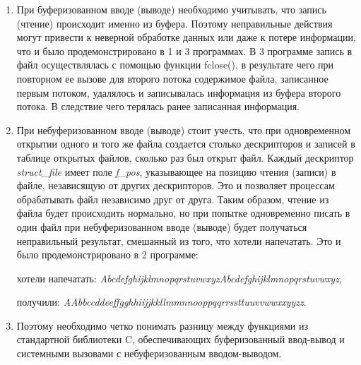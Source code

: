 \documentclass[a4paper,12pt]{article}
\begin{document}
	\begin{enumerate}
		\item При буферизованном вводе (выводе) необходимо учитывать, что запись
		(чтение) происходит именно из буфера. Поэтому неправильные действия
		могут привести к неверной обработке данных или даже к потере информации, что и было продемонстрировано в 1 и 3 программах. В 3 программе запись в файл осуществлялась с помощью функции fclose(), в результате чего при повторном ее вызове для второго потока содержимое файла, записанное первым потоком, удалялось и записывалась информация из буфера второго потока. В следствие чего терялась ранее записанная информация.
		\item При небуферизованном вводе (выводе) стоит учесть, что при одновременном открытии одного и того же файла создается столько дескрипторов и записей в таблице открытых файлов, сколько раз был открыт файл. Каждый дескриптор \textit{struct\_file} имеет поле \textit{f\_pos}, указывающее на позицию чтения (записи) в файле, независящую от других дескрипторов. Это и позволяет процессам обрабатывать файл независимо друг от друга. Таким образом, чтение из файла будет происходить нормально, но при попытке одновременно писать в один файл при небуферизованном вводе (выводе) будет получаться неправильный результат, смешанный из того, что хотели напечатать. Это и было продемонстрировано в 2 программе: 
		
		хотели напечатать: \textit{AbcdefghijklmnopqrstuvwxyzAbcdefghijklmnopqrstuvwxyz},
		
		получили: \textit{AAbbccddeeffgghhiijjkkllmmnnooppqqrrssttuuvvwwxxyyzz}.
		\item Поэтому необходимо четко понимать разницу между функциями из стандартной библиотеки C, обеспечивающих буферизованный ввод-вывод и системными вызовами с небуферизованным вводом-выводом.
	\end{enumerate}

	
\end{document}

